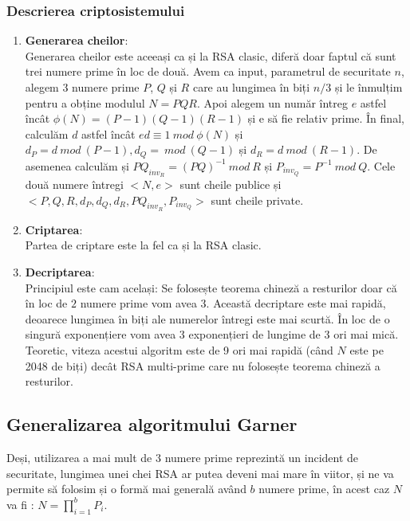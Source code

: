 \documentclass[12pt, oneside]{book}
\begin{document}
		 \subsubsection{Descrierea criptosistemului}
		 \begin{enumerate}
		  \item \textbf{Generarea cheilor}: \\
		  Generarea cheilor este aceeași ca și la RSA clasic, diferă doar faptul că sunt trei numere prime în loc de două. Avem ca input, parametrul de securitate $n$, alegem 3 numere prime $P$, $Q$ și $R$ care au lungimea în biți $n/3$ și le înmulțim pentru a obține modulul $N=PQR$. Apoi alegem un număr întreg $e$ astfel încât $\phi(N)=(P-1)(Q-1)(R-1)$ și e să fie relativ prime. În final, calculăm $d$ astfel încât $ed \equiv 1 \ mod \ \phi(N)$ și $d_P=d \ mod \ (P-1), d_Q= \ mod \ (Q-1)$ și $d_R=d \ mod \ (R-1)$. De asemenea calculăm și $PQ_{inv_R}=(PQ)^{-1} \ mod \ R$ și $P_{inv_Q}=P^{-1} \ mod \ Q$. Cele două numere întregi $<N,e>$ sunt cheile publice și $<P,Q,R,d_P,d_Q,d_R,PQ_{inv_R},P_{inv_Q}>$ sunt cheile private.
		  
		  \item \textbf{Criptarea}: \\
		  Partea de criptare este la fel ca și la RSA clasic.
		  
		  \item \textbf{Decriptarea}: \\
		  Principiul este cam același: Se folosește teorema chineză a resturilor doar că în loc de $2$ numere prime vom avea $3$. Această decriptare este mai rapidă, deoarece lungimea în biți ale numerelor întregi este mai scurtă. În loc de o singură exponențiere vom avea 3 exponențieri de lungime de 3 ori mai mică. Teoretic, viteza acestui algoritm este de 9 ori mai rapidă (când $N$ este pe 2048 de biți) decât RSA multi-prime care nu folosește teorema chineză a resturilor.
		  
		 \end{enumerate}
		 
		 \subsection{Generalizarea algoritmului Garner}
		 Deși, utilizarea a mai mult de $3$ numere prime reprezintă un incident de securitate, lungimea unei chei RSA ar putea deveni mai mare în viitor, și ne va permite să folosim și o formă mai generală având $b$ numere prime, în acest caz $N$ va fi : $N=\prod_{i=1}^{b} P_i$.
\end{document}
